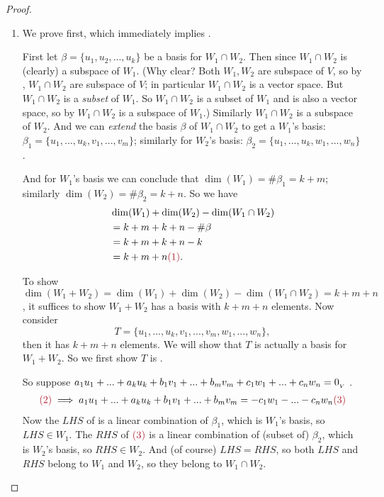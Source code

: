 \begin{proof} \ 

\begin{enumerate}
\item
We prove  first, which immediately implies .

First let \(\beta = \{ u_1, u_2, ..., u_k \}\) be a basis for \(W_1 \cap W_2\).
Then since \(W_1 \cap W_2\) is (clearly) a subspace of \(W_1\). (Why clear? Both \(W_1, W_2\) are subspace of \(V\), so by , \(W_1 \cap W_2\) are subspace of \(V\);
in particular \(W_1 \cap W_2\) is a vector space.
But \(W_1 \cap W_2\) is a \emph{subset} of \(W_1\).
So \(W_1 \cap W_2\) is a subset of \(W_1\) and is also a vector space, so by  \(W_1 \cap W_2\) is a subspace of \(W_1\).)
Similarly \(W_1 \cap W_2\) is a subspace of \(W_2\).
And  we can \emph{extend} the basis \(\beta\) of \(W_1 \cap W_2\) to get a \(W_1\)'s basis: \(\beta_1 = \{ u_1, ..., u_k, v_1, ..., v_m \}\);
similarly for \(W_2\)'s basis: \(\beta_2 = \{ u_1, ..., u_k, w_1, ..., w_n \}\).

And for \(W_1\)'s basis we can conclude that \(\dim(W_1) = \#\beta_1 = k + m\);
similarly \(\dim(W_2) = \#\beta_2 = k + n\).
So we have
\begin{align*}
    & \dim(W_1) + \dim(W_2) - \dim(W_1 \cap W_2) \\
    & = k + m + k + n - \#\beta \\
    & = k + m + k + n - k \\ 
    & = k + m + n \MAROON{(1)}.
\end{align*}

\sloppy To show \(\dim(W_1 + W_2) = \dim(W_1) + \dim(W_2) - \dim(W_1 \cap W_2) = k + m + n\), it suffices to show \(W_1 + W_2\) has a basis with \(k + m + n\) elements.
Now consider
\[
    T = \{ u_1, ..., u_k, v_1, ..., v_m, w_1, ..., w_n \},
\]
then it has \(k + m + n\) elements.
We will show that \(T\) is actually a basis for \(W_1 + W_2\).
So we first show \(T\) is \LID{}.

So suppose \(a_1 u_1 + ... + a_k u_k + b_1 v_1 + ... + b_m v_m + c_1 w_1 + ... + c_n w_n = 0_{_V}\) .
\begin{align*}
    \MAROON{(2)} \implies a_1 u_1 + ... + a_k u_k + b_1 v_1 + ... + b_m v_m = - c_1 w_1 - ... - c_n w_n \MAROON{(3)}
\end{align*}
Now the \(LHS\) of  is a linear combination of \(\beta_1\), which is \(W_1\)'s basis, so \(LHS \in W_1\).
The \(RHS\) of \(\MAROON{(3)}\) is a linear combination of (subset of) \(\beta_2\), which is \(W_2\)'s basis, so \(RHS \in W_2\).
And (of course) \(LHS = RHS\), so both \(LHS\) and \(RHS\) belong to \(W_1\) and \(W_2\), so they belong to \(W_1 \cap W_2\).


\end{enumerate}
\end{proof}
